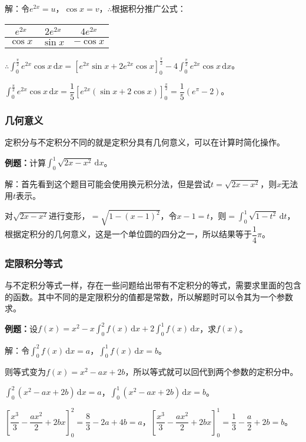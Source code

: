 \documentclass[UTF8, 12pt]{ctexart}
\begin{document}
解：令$e^{2x}=u$，$\cos x=v$，$\therefore$根据积分推广公式：\medskip

\begin{tabular}{|c|c|c|}
    \hline
    $e^{2x}$ & $2e^{2x}$ & $4e^{2x}$ \\ \hline
    $\cos x$ & $\sin x$ & $-\cos x$ \\
    \hline
\end{tabular} \medskip

$\therefore\int_0^\frac{\pi}{2}e^{2x}\cos x\,\textrm{d}x=[e^{2x}\sin x+2e^{2x}\cos x]_0^\frac{\pi}{2}-4\int_0^\frac{\pi}{2}e^{2x}\cos x\,\textrm{d}x$。

$\int_0^\frac{\pi}{2}e^{2x}\cos x\,\textrm{d}x=\dfrac{1}{5}[e^{2x}(\sin x+2\cos x)]_0^\frac{\pi}{2}=\dfrac{1}{5}(e^\pi-2)$。

\subsubsection{几何意义}

定积分与不定积分不同的就是定积分具有几何意义，可以在计算时简化操作。

\textbf{例题：}计算$\int_0^1\sqrt{2x-x^2}\,\textrm{d}x$。

解：首先看到这个题目可能会使用换元积分法，但是尝试$t=\sqrt{2x-x^2}$，则$x$无法用$t$表示。

对$\sqrt{2x-x^2}$进行变形，$=\sqrt{1-(x-1)^2}$，令$x-1=t$，则$=\int_0^1\sqrt{1-t^2}\,\textrm{d}t$，根据定积分的几何意义，这是一个单位圆的四分之一，所以结果等于$\dfrac{1}{4}\pi$。

\subsubsection{定限积分等式}

与不定积分等式一样，存在一些问题给出带有不定积分的等式，需要求里面的包含的函数。其中不同的是定限积分的值都是常数，所以解题时可以令其为一个参数求。

\textbf{例题：}设$f(x)=x^2-x\int_0^2f(x)\,\textrm{d}x+2\int_0^1f(x)\,\textrm{d}x$，求$f(x)$。

解：令$\int_0^2f(x)\,\textrm{d}x=a$，$\int_0^1f(x)\,\textrm{d}x=b$。

则等式变为$f(x)=x^2-ax+2b$，所以等式就可以回代到两个参数的定积分中。

$\int_0^2(x^2-ax+2b)\,\textrm{d}x=a$，$\int_0^1(x^2-ax+2b)\,\textrm{d}x=b$。

$\left[\dfrac{x^3}{3}-\dfrac{ax^2}{2}+2bx\right]_0^2=\dfrac{8}{3}-2a+4b=a$，$\left[\dfrac{x^3}{3}-\dfrac{ax^2}{2}+2bx\right]_0^1=\dfrac{1}{3}-\dfrac{a}{2}+2b=b$。
\end{document}
